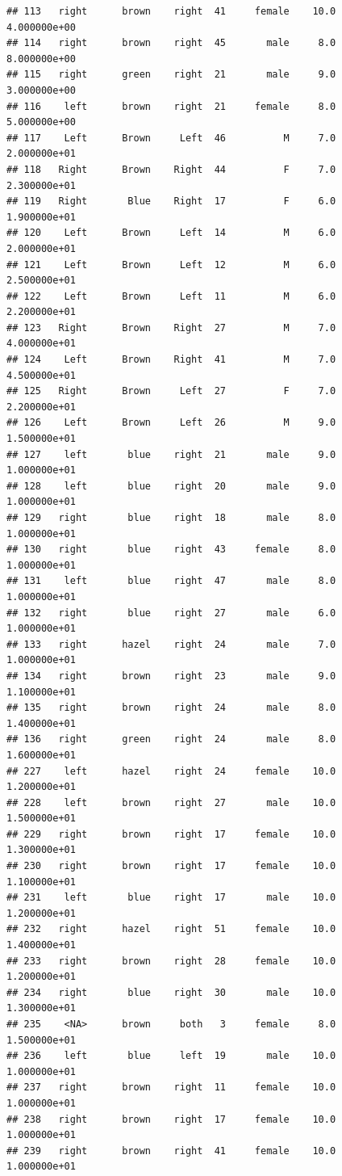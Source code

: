 \documentclass[]{article}
\begin{document}
\begin{verbatim}
## 113   right      brown    right  41     female    10.0  4.000000e+00
## 114   right      brown    right  45       male     8.0  8.000000e+00
## 115   right      green    right  21       male     9.0  3.000000e+00
## 116    left      brown    right  21     female     8.0  5.000000e+00
## 117    Left      Brown     Left  46          M     7.0  2.000000e+01
## 118   Right      Brown    Right  44          F     7.0  2.300000e+01
## 119   Right       Blue    Right  17          F     6.0  1.900000e+01
## 120    Left      Brown     Left  14          M     6.0  2.000000e+01
## 121    Left      Brown     Left  12          M     6.0  2.500000e+01
## 122    Left      Brown     Left  11          M     6.0  2.200000e+01
## 123   Right      Brown    Right  27          M     7.0  4.000000e+01
## 124    Left      Brown    Right  41          M     7.0  4.500000e+01
## 125   Right      Brown     Left  27          F     7.0  2.200000e+01
## 126    Left      Brown     Left  26          M     9.0  1.500000e+01
## 127    left       blue    right  21       male     9.0  1.000000e+01
## 128    left       blue    right  20       male     9.0  1.000000e+01
## 129   right       blue    right  18       male     8.0  1.000000e+01
## 130   right       blue    right  43     female     8.0  1.000000e+01
## 131    left       blue    right  47       male     8.0  1.000000e+01
## 132   right       blue    right  27       male     6.0  1.000000e+01
## 133   right      hazel    right  24       male     7.0  1.000000e+01
## 134   right      brown    right  23       male     9.0  1.100000e+01
## 135   right      brown    right  24       male     8.0  1.400000e+01
## 136   right      green    right  24       male     8.0  1.600000e+01
## 227    left      hazel    right  24     female    10.0  1.200000e+01
## 228    left      brown    right  27       male    10.0  1.500000e+01
## 229   right      brown    right  17     female    10.0  1.300000e+01
## 230   right      brown    right  17     female    10.0  1.100000e+01
## 231    left       blue    right  17       male    10.0  1.200000e+01
## 232   right      hazel    right  51     female    10.0  1.400000e+01
## 233   right      brown    right  28     female    10.0  1.200000e+01
## 234   right       blue    right  30       male    10.0  1.300000e+01
## 235    <NA>      brown     both   3     female     8.0  1.500000e+01
## 236    left       blue     left  19       male    10.0  1.000000e+01
## 237   right      brown    right  11     female    10.0  1.000000e+01
## 238   right      brown    right  17     female    10.0  1.000000e+01
## 239   right      brown    right  41     female    10.0  1.000000e+01

\end{verbatim}
\end{document}
